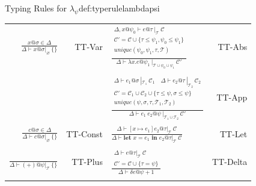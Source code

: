 \begin{definitiontitled}{Typing Rules for $\lambda_\psi$}{def:typerulelambdapsi}
\begin{tabularx}{\textwidth}{ r r X r}
\centering
$ \displaystyle \frac{ x @ \sigma \in \Delta
}{      \Delta \vdash x @ \sigma |_\varnothing \: \{\}}
$ &
TT-Var
&
$ \displaystyle 
\frac{  \begin{array}{c}
          \Delta,x@\psi_0 \vdash e @ \tau \: |_\mathcal{T} \: \mathcal{C}\\
          \mathcal{C}' = \mathcal{C} \cup \{ \tau \le \psi_1, \psi_0 \le \psi_1 \}  \\
          unique(\psi_0, \psi_1, \tau, \mathcal{T}) \\
        \end{array}
} { \Delta \vdash \lambda x.e @ \psi_1 \: |_{\mathcal{T} \cup \psi_0 \cup \psi_1} \: \mathcal{C}'}
$ 
& TT-Abs \\
\\

& &
$ \displaystyle
\frac{  \begin{array}{c}
          \Delta \vdash e_1 @ \sigma \: |_{\mathcal{T}_1} \: \mathcal{C}_1 
            \quad \Delta \vdash e_2 @ \tau \: |_{\mathcal{T}_2} \: \mathcal{C}_2 \\
          \mathcal{C}' = \mathcal{C}_1 \cup \mathcal{C}_2 \cup \{\tau \le \psi, \sigma \le \psi \} \\
          unique(\psi, \sigma, \tau ,\mathcal{T}_1, \mathcal{T}_2) \\
        \end{array}
} { \Delta \vdash e_1 \: e_2 @ \psi \: |_{\mathcal{T}_1 \cup \mathcal{T}_2} \: \mathcal{C}' }
$ & TT-App \\
\\

$ \displaystyle
  \frac
    { c @ \sigma \in \Delta }
    { \Delta \vdash c @ \sigma |_\varnothing \: \{\}}
$
&
TT-Const
& 
\centering
$ \displaystyle
  \frac
  { \Delta \vdash [ x \mapsto e_1] e_2 @ \tau |_\mathcal{T} \: \mathcal{C} }
  { \Delta \vdash \textbf{let } x = e_1 \textbf{ in } e_2 @ \tau |_\mathcal{T} \: \mathcal{C}} 
$
&
TT-Let\\
\\

$ \displaystyle
  \frac
  { }
  {\Delta \vdash (+) @ \psi |_\mathcal{T} \: \{\}}
$
&
TT-Plus
&
\centering
$ \displaystyle
  \frac
  { \begin{array}{c}
      \Delta \vdash e @ \tau |_\mathcal{T} \: \mathcal{C}\\
      \mathcal{C}' = \mathcal{C} \cup \{\tau = \psi\}
    \end{array}
  }
  { \Delta \vdash \delta e @ \psi + 1 } 
$
& 
TT-Delta\\
\\


\end{tabularx}
\end{definitiontitled}

